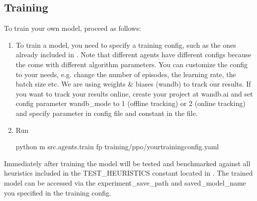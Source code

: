 \documentclass[letterpaper,10pt,english]{sphinxmanual}
\begin{document}
\subsection{Training}
\label{\detokenize{quickstart:training}}
\sphinxAtStartPar
To train your own model, proceed as follows:
\begin{enumerate}
%
\item {} 
\sphinxAtStartPar
To train a model, you need to specify a training config, such as the ones already included in . Note that different agents have different configs because the come with different algorithm parameters. You can customize the config to your needs, e.g. change the number of episodes, the learning rate, the batch size etc.
We are using weights \& biases (wandb) to track our results.
If you want to track your results online, create your project at wandb.ai and set config parameter wandb\_mode to 1 (offline tracking) or 2 (online tracking)
and specify  parameter in config file and  constant in the  file.

\item {} 
\sphinxAtStartPar
Run

\begin{sphinxVerbatim}[commandchars=\\\{\}]
python \PYGZhy{}m src.agents.train \PYGZhy{}fp training/ppo/\PYGZlt{}your\PYGZus{}training\PYGZus{}config\PYGZgt{}.yaml
\end{sphinxVerbatim}

\end{enumerate}

\sphinxAtStartPar
Immediately after training the model will be tested and benchmarked against all heuristics included in the TEST\_HEURISTICS constant located in .
The trained model can be accessed via the experiment\_save\_path and saved\_model\_name you specified in the training config.
\end{document}
